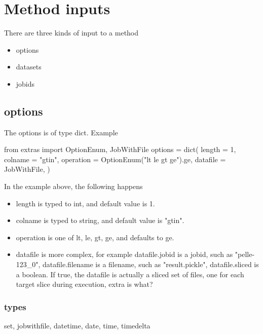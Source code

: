 \section{Method inputs}

There are three kinds of input to a method
\begin{itemize}
\item options
\item datasets
\item jobids
\end{itemize}


\subsection*{options}
The options is of type dict.  Example

\begin{python}
from extras import OptionEnum, JobWithFile
options = dict(
  length = 1,
  colname = "gtin",
  operation = OptionEnum("lt le gt ge").ge,
  datafile = JobWithFile,
)
\end{python}
In the example above, the following happens
\begin{itemize}
\item length is typed to int, and default value is 1.
\item colname is typed to string, and default value is "gtin".
\item operation is one of lt, le, gt, ge, and defaults to ge.
\item datafile is more complex, for example datafile.jobid is a jobid,
  such as "pelle-123\_0", datafile.filename is a filename, such as
  "result.pickle", datafile.sliced is a boolean.  If true, the
  datafile is actually a sliced set of files, one for each target
  slice during execution, extra is what?
\end{itemize}

\subsubsection{types}
set, jobwithfile, datetime, date, time, timedelta




